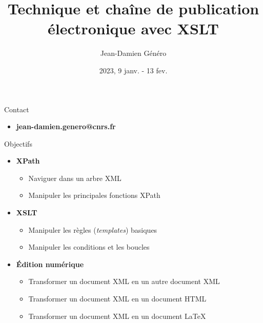 \documentclass{beamer}
\title{Technique et chaîne de publication électronique avec XSLT}
\date{2023, 9 janv. - 13 fev.}
\author{Jean-Damien Généro}
\institute{École nationale des chartes -- M2 TNAH}
\begin{document}
  \maketitle
  
  \begin{frame}{Contact}
  \Large
      \begin{itemize}
          \item \textbf{jean-damien.genero@cnrs.fr}
      \end{itemize}
  \end{frame}


    \begin{frame}{Objectifs}
  \Large
      \begin{itemize}
          \item \textbf{XPath}
          \begin{itemize}
              \item Naviguer dans un arbre XML
              \item Manipuler les principales fonctions XPath
          \end{itemize}
          \item \textbf{XSLT}
          \begin{itemize}
              \item Manipuler les règles (\textit{templates}) basiques
              \item Manipuler les conditions et les boucles
          \end{itemize}
          \item \textbf{Édition numérique}
          \begin{itemize}
              \item Transformer un document XML en un autre document XML
              \item Transformer un document XML en un document HTML
              \item Transformer un document XML en un document \LaTeX
          \end{itemize}
      \end{itemize}
  \end{frame}
   
\end{document}
